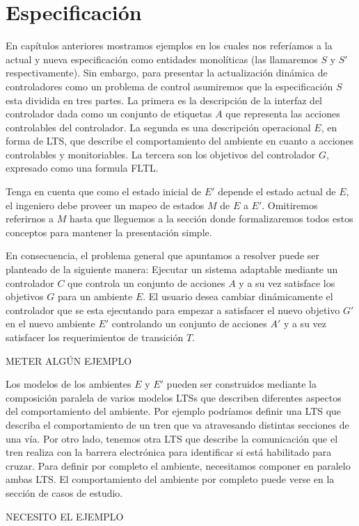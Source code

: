 \section{Especificación}

En capítulos anteriores mostramos ejemplos en los cuales nos referíamos a la actual y nueva especificación como
entidades monolíticas (las llamaremos $S$ y $S'$ respectivamente). Sin embargo, para presentar la actualización dinámica
de controladores como un problema de control asumiremos que la especificación $S$ esta dividida en tres partes. La
primera es la descripción de la interfaz del controlador dada como un conjunto de etiquetas $A$ que representa las
acciones controlables del controlador. La segunda es una descripción operacional $E$, en forma de LTS, que describe el
comportamiento del ambiente en cuanto a acciones controlables y monitoriables. La tercera son los objetivos del
controlador $G$, expresado como una formula FLTL.

Tenga en cuenta que como el estado inicial de $E'$ depende el estado actual de $E$, el ingeniero debe proveer un mapeo de estados
$M$ de $E$ a $E'$. Omitiremos referirnos a $M$ hasta que lleguemos a la sección donde formalizaremos todos estos
conceptos para mantener la presentación simple.

En consecuencia, el problema general que apuntamos a resolver puede ser planteado de la siguiente manera: Ejecutar
un sistema adaptable mediante un controlador $C$ que controla un conjunto de acciones $A$ y a su vez satisface los
objetivos $G$ para un ambiente $E$. El usuario desea cambiar dinámicamente el controlador que se esta ejecutando para
empezar a satisfacer el nuevo objetivo $G'$ en el nuevo ambiente $E'$ controlando un conjunto de acciones $A'$ y a su
vez satisfacer los requerimientos de transición $T$.

METER ALGÚN EJEMPLO

Los modelos de los ambientes $E$ y $E'$ pueden ser construidos mediante la composición paralela de varios modelos LTSs
que describen diferentes aspectos del comportamiento del ambiente. Por ejemplo podríamos definir una LTS que describa el
comportamiento de un tren que va atravesando distintas secciones de una vía. Por otro lado, tenemos otra LTS que
describe la comunicación que el tren realiza con la barrera electrónica para identificar si está habilitado para cruzar.
Para definir por completo el ambiente, necesitamos componer en paralelo ambas LTS. El comportamiento del ambiente por
completo puede verse en la sección de casos de estudio.

NECESITO EL EJEMPLO
